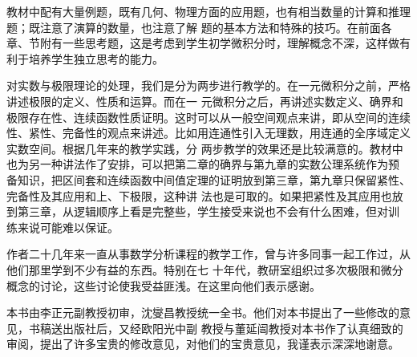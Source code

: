 \begin{preface}
教材中配有大量例题，既有几何、物理方面的应用题，也有相当数量的计算和推理题；既注意了演算的数量，也注意了解
题的基本方法和特殊的技巧。在前面各章、节附有一些思考题，这是考虑到学生初学微积分时，理解概念不深，这样做有
利于培养学生独立思考的能力。

对实数与极限理论的处理，我们是分为两步进行教学的。在一元微积分之前，严格讲述极限的定义、性质和运算。而在一
元微积分之后，再讲述实数定义、确界和极限存在性、连续函数性质证明。这时可以从一般空间观点来讲，即从空间的连续
性、紧性、完备性的观点来讲述。比如用连通性引入无理数，用连通的全序域定义实数空间。根据几年来的教学实践，分
两步教学的效果还是比较满意的。教材中也为另一种讲法作了安排，可以把第二章的确界与第九章的实数公理系统作为预
备知识，把区间套和连续函数中间值定理的证明放到第三章，第九章只保留紧性、完备性及其应用和上、下极限，这种讲
法也是可取的。如果把紧性及其应用也放到第三章，从逻辑顺序上看是完整些，学生接受来说也不会有什么困难，但对训
练来说可能难以保证。

作者二十几年来一直从事数学分析课程的教学工作，曾与许多同事一起工作过，从他们那里学到不少有益的东西。特别在七
十年代，教研室组织过多次极限和微分概念的讨论，这些讨论使我受益匪浅。在这里向他们表示感谢。

本书由李正元副教授初审，沈燮昌教授统一全书。他们对本书提出了一些修改的意见，书稿送出版社后，又经欧阳光中副
教授与董延闿教授对本书作了认真细致的审阅，提出了许多宝贵的修改意见，对他们的宝贵意见，我谨表示深深地谢意。
\end{preface}

\endinput
